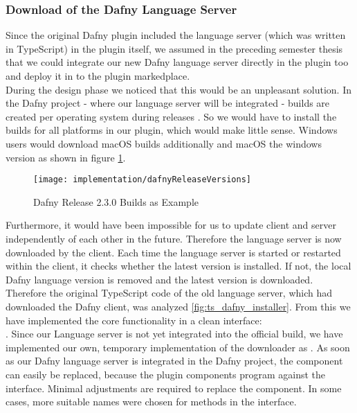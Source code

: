 \subsubsection{Download of the Dafny Language Server}
\label{section:implementation:client:download}
Since the original Dafny plugin included the language server (which was written in TypeScript) in the plugin itself,
we assumed in the preceding semester thesis that we could integrate our new Dafny language server directly in the plugin too
and deploy it in to the plugin markedplace. \\

During the design phase we noticed that this would be an unpleasant solution.
In the Dafny project - where our language server will be integrated - builds
are created per operating system during releases \cite{dafny_lang_builds}.
So we would have to install the builds for all platforms in our plugin,
which would make little sense.
Windows users would download macOS builds additionally and macOS the windows version as shown in figure \ref{fig:dafnyReleaseVersions}.

\begin{figure}[H]
    \centering
    \texttt{[image: implementation/dafnyReleaseVersions]}
    \caption{Dafny Release 2.3.0 Builds as Example}
    \label{fig:dafnyReleaseVersions}
\end{figure}

Furthermore, it would have been impossible for us to update client and server independently of each other in the future.
Therefore the language server is now downloaded by the client.
Each time the language server is started or restarted within the client,
it checks whether the latest version is installed.
If not, the local Dafny language version is removed and the latest version is downloaded. \\

Therefore the original TypeScript code of the old language server,
which had downloaded the Dafny client, was analyzed \ref{fig:ts_dafny_installer}.
From this we have implemented the core functionality in a clean interface: \\
.
Since our Language server is not yet integrated into the official build,
we have implemented our own, temporary implementation of the downloader as .
As soon as our Dafny language server is integrated in the Dafny project,
the component can easily be replaced, because the plugin components program against the interface.
Minimal adjustments are required to replace the component. In some cases, more suitable names were chosen for methods in the interface.

